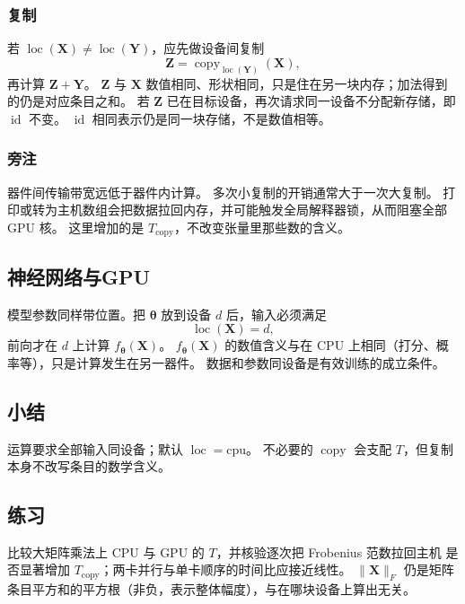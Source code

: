 \subsubsection{复制}

若 $\operatorname{loc}(\bm{X})\neq\operatorname{loc}(\bm{Y})$，应先做设备间复制
\[
\bm{Z}=\operatorname{copy}_{\operatorname{loc}(\bm{Y})}(\bm{X}),
\]
再计算 $\bm{Z}+\bm{Y}$。
$\bm{Z}$ 与 $\bm{X}$ 数值相同、形状相同，只是住在另一块内存；加法得到的仍是对应条目之和。
若 $\bm{Z}$ 已在目标设备，再次请求同一设备不分配新存储，即 $\operatorname{id}$ 不变。
$\operatorname{id}$ 相同表示仍是同一块存储，不是数值相等。

\subsubsection{旁注}

器件间传输带宽远低于器件内计算。
多次小复制的开销通常大于一次大复制。
打印或转为主机数组会把数据拉回内存，并可能触发全局解释器锁，从而阻塞全部 GPU 核。
这里增加的是 $T_{\mathrm{copy}}$，不改变张量里那些数的含义。

\subsection{神经网络与GPU}

模型参数同样带位置。把 $\bm{\theta}$ 放到设备 $d$ 后，输入必须满足
\[
\operatorname{loc}(\bm{X})=d,
\]
前向才在 $d$ 上计算 $f_{\bm{\theta}}(\bm{X})$。
$f_{\bm{\theta}}(\bm{X})$ 的数值含义与在 CPU 上相同（打分、概率等），只是计算发生在另一器件。
数据和参数同设备是有效训练的成立条件。

\subsection{小结}

运算要求全部输入同设备；默认 $\operatorname{loc}=\mathrm{cpu}$。
不必要的 $\operatorname{copy}$ 会支配 $T$，但复制本身不改写条目的数学含义。

\subsection{练习}

比较大矩阵乘法上 CPU 与 GPU 的 $T$，并核验逐次把 Frobenius 范数拉回主机
是否显著增加 $T_{\mathrm{copy}}$；两卡并行与单卡顺序的时间比应接近线性。
$\|\bm{X}\|_F$ 仍是矩阵条目平方和的平方根（非负，表示整体幅度），与在哪块设备上算出无关。
